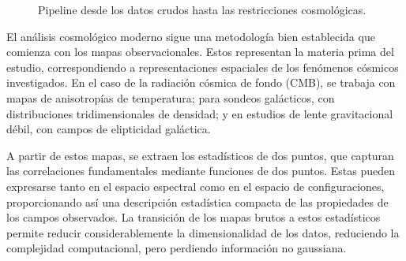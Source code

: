 \begin{figure}[htbp]
    \centering
    \caption{Pipeline desde los datos crudos hasta las restricciones cosmológicas.}
    \label{fig:pipeline_cosmo}
\end{figure}

El análisis cosmológico moderno sigue una metodología bien establecida que comienza con los mapas observacionales. Estos representan la materia prima del estudio, correspondiendo a representaciones espaciales de los fenómenos cósmicos investigados. En el caso de la radiación cósmica de fondo (CMB), se trabaja con mapas de anisotropías de temperatura; para sondeos galácticos, con distribuciones tridimensionales de densidad; y en estudios de lente gravitacional débil, con campos de elipticidad galáctica.

A partir de estos mapas, se extraen los estadísticos de dos puntos, que capturan las correlaciones fundamentales mediante funciones de dos puntos. Estas pueden expresarse tanto en el espacio espectral como en el espacio de configuraciones, proporcionando así una descripción estadística compacta de las propiedades de los campos observados. La transición de los mapas brutos a estos estadísticos permite reducir considerablemente la dimensionalidad de los datos, reduciendo la complejidad computacional, pero perdiendo información no gaussiana.

